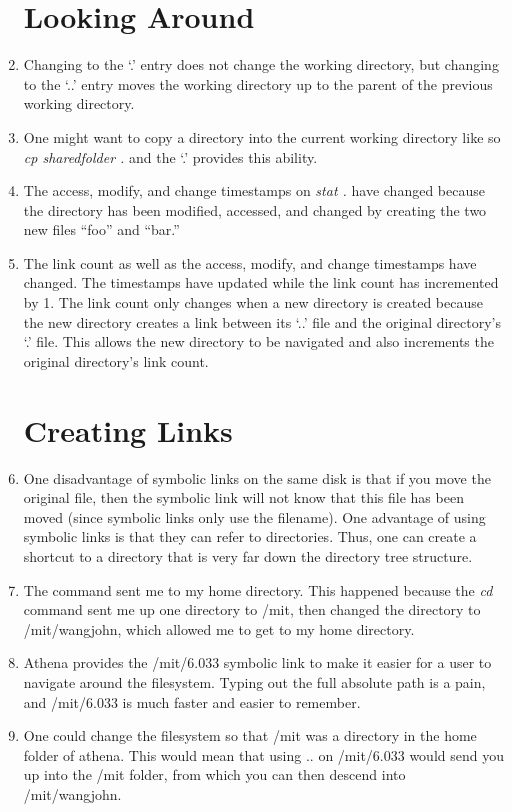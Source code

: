 \documentclass[psamsfonts]{amsart}
\begin{document}
\begin{enumerate}
    \section{Looking Around}
  \item Changing to the `.' entry does not change the working directory, but changing to the `..' entry moves the working directory up to the parent of the previous working directory.
  \item One might want to copy a directory into the current working directory like so \emph{cp sharedfolder .} and the `.' provides this ability.
  \item The access, modify, and change timestamps on \emph{stat .} have changed because the directory has been modified, accessed, and changed by creating the two new files ``foo'' and ``bar.''
  \item The link count as well as the access, modify, and change timestamps have changed. The timestamps have updated while the link count has incremented by 1. The link count only changes when a new directory is created because the new directory creates a link between its `..' file and the original directory's `.' file. This allows the new directory to be navigated and also increments the original directory's link count.
    \section{Creating Links}
  \item One disadvantage of symbolic links on the same disk is that if you move the original file, then the symbolic link will not know that this file has been moved (since symbolic links only use the filename). One advantage of using symbolic links is that they can refer to directories. Thus, one can create a shortcut to a directory that is very far down the directory tree structure.
  \item The command sent me to my home directory. This happened because the \emph{cd} command sent me up one directory to /mit, then changed the directory to /mit/wangjohn, which allowed me to get to my home directory.
  \item Athena provides the /mit/6.033 symbolic link to make it easier for a user to navigate around the filesystem. Typing out the full absolute path is a pain, and /mit/6.033 is much faster and easier to remember.
  \item One could change the filesystem so that /mit was a directory in the home folder of athena. This would mean that using .. on /mit/6.033 would send you up into the /mit folder, from which you can then descend into /mit/wangjohn.

\end{enumerate}
\end{document}
